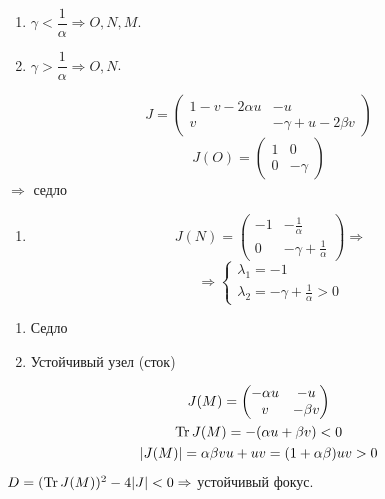         \begin{enumerate}[label = \alph*)]
        \item $\gamma < \dfrac{1}{\alpha} \Rightarrow O, N, M$.
        \item $\gamma > \dfrac{1}{\alpha} \Rightarrow O, N$.
        \end{enumerate}
        $$J = \begin{pmatrix}
        1 - v - 2\alpha u & -u\\
        v & -\gamma + u - 2\beta v
\end{pmatrix}                
        $$
        $$J(O) = \begin{pmatrix}
        1 & 0\\
        0 & -\gamma
        \end{pmatrix}
        $$
        $\Rightarrow$ седло
        \begin{enumerate}[label = \alph*)]
        \item $$J(N) = \begin{pmatrix}
        -1 & -\frac{1}{\alpha}\\
        0 & -\gamma + \frac{1}{\alpha}
        \end{pmatrix}
        \Rightarrow
        $$
        $$\Rightarrow \begin{cases}
        \lambda_1 = -1\\
        \lambda_2 = -\gamma + \frac{1}{\alpha} > 0
        \end{cases}
        $$
        \end{enumerate}
        
        \begin{enumerate}[label = \alph*)]
        \item Седло
        \item Устойчивый узел (сток)
        \end{enumerate}
        \begin{gather*}
        J(M) = \begin{pmatrix}
        -\alpha u & -u\\
        v & -\beta v
        \end{pmatrix}\\
        \TrCh6 J(M) = -(\alpha u + \beta v) < 0\\
        |J(M)| = \alpha \beta v u + uv = (1 + \alpha \beta) uv > 0
        \end{gather*}
        $D = (\TrCh6 J(M))^2 - 4|J| < 0 \Rightarrow$  устойчивый фокус.    

